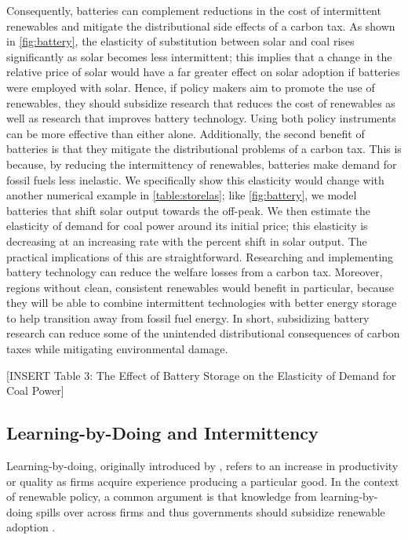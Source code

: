 \documentclass[11pt,a4paper,leqno]{extarticle}
\begin{document}
	
	Consequently, batteries can complement reductions in the cost of intermittent renewables and mitigate the distributional side effects of a carbon tax. As shown in \autoref{fig:battery}, the elasticity of substitution between solar and coal rises significantly as solar becomes less intermittent; this implies that a change in the relative price of solar would have a far greater effect on solar adoption if batteries were employed with solar. Hence, if policy makers aim to promote the use of renewables, they should subsidize research that reduces the cost of renewables as well as research that improves battery technology. Using both policy instruments can be more effective than either alone. Additionally, the second benefit of batteries is that they mitigate the distributional problems of a carbon tax. This is because, by reducing the intermittency of renewables, batteries make demand for fossil fuels less inelastic. We specifically show this elasticity would change with another numerical example in \autoref{table:storelas}; like  \autoref{fig:battery}, we model batteries that shift solar output towards the off-peak. We then estimate the elasticity of demand for coal power around its initial price; this elasticity is decreasing at an increasing rate with the percent shift in solar output. The practical implications of this are straightforward. Researching and implementing battery technology can reduce the welfare losses from a carbon tax. Moreover, regions without clean, consistent renewables would benefit in particular, because they will be able to combine intermittent technologies with better energy storage to help transition away from fossil fuel energy. In short, subsidizing battery research can reduce some of the unintended distributional consequences of carbon taxes while mitigating environmental damage. 
	
	
	\vspace{0.15in}
	\begin{center}
		[INSERT Table 3: The Effect of Battery Storage on the  Elasticity of Demand for Coal Power]
	\end{center}
	\vspace{0.15in}
	
	\subsection{Learning-by-Doing and Intermittency}
	
	Learning-by-doing, originally introduced by \citet{A1962}, refers to an increase in productivity or quality as firms acquire experience producing a particular good. In the context of renewable policy, a common argument is that knowledge from learning-by-doing spills over across firms and thus governments should subsidize renewable adoption \citep{Boren2012}. 
	
\end{document}
